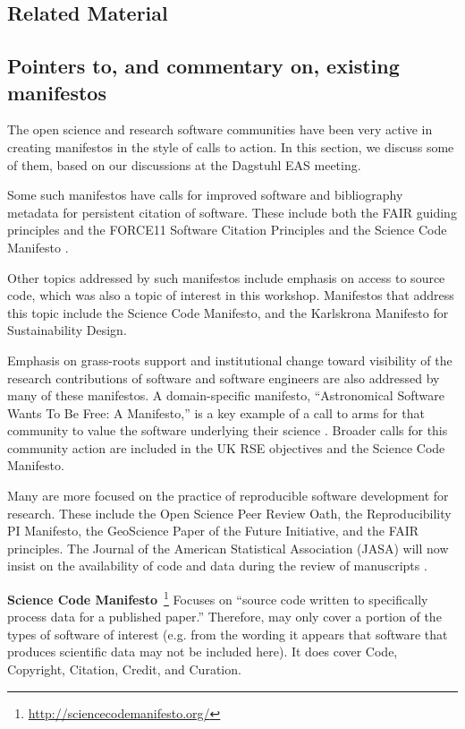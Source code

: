 \documentclass[a4paper,UKenglish]{dagman}
\newcommand{\manifesto}[1]{{\bf #1}\xspace}
\begin{document}
\begin{appendix}
\section{Related Material}

\subsection*{Pointers to, and commentary on, existing manifestos}
The open science and research software communities have been very active in creating manifestos in the style of calls to action. In this section, we discuss some of them, based on our discussions at the
Dagstuhl EAS meeting.

Some such manifestos have calls for improved software and bibliography metadata for persistent citation of software. These include both the FAIR guiding principles and the FORCE11 Software Citation Principles and the Science Code Manifesto \cite{wilkinson_fair_2016,arfon_m._smith_software_2016,nick_barnes_science_2013}.

Other topics addressed by such manifestos include emphasis on access to source code, which was also a topic of interest in this workshop. Manifestos that address this topic include the Science Code Manifesto, and the Karlskrona Manifesto for Sustainability Design.

Emphasis on grass-roots support and institutional change toward visibility of the research contributions of software and software engineers are also addressed by many of these manifestos. A domain-specific manifesto, ``Astronomical Software Wants To Be Free: A Manifesto,'' is a key example of a call to arms for that community to value the software underlying their science \cite{weiner_astronomical_2009}. Broader calls for this community action are included in the  UK RSE objectives and the Science Code Manifesto.

Many are more focused on the practice of reproducible software development for research. These include the Open Science Peer Review Oath, the Reproducibility PI Manifesto, the GeoScience Paper of the Future Initiative, and the FAIR principles.
The Journal of the American Statistical Association (JASA) will now insist on the availability of code and data during the review of manuscripts \cite{Baker2016}.

\manifesto{Science Code Manifesto}~\cite{nick_barnes_science_2013}\footnote{\url{http://sciencecodemanifesto.org/}}
Focuses on ``source code written to specifically process data for a published paper.''
Therefore, may only cover a portion of the types of software of interest (e.g. from the wording it appears that software that produces scientific data may not be included here).
It does cover Code, Copyright, Citation, Credit, and Curation.


\end{appendix}
\end{document}
